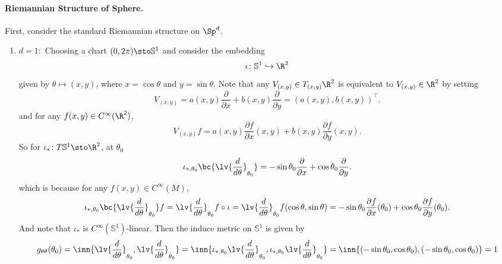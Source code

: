 \paragraph{Riemannian Structure of Sphere.} First, consider the standard Riemannian structure on $\Sp^d$.
\begin{enumerate}[label=\arabic{*}.]
    \item $d = 1:$ Choosing a chart $(0,2\pi) \sto \mathbb{S}^1$ and consider the embedding
    \begin{equation*}
        \iota \colon \mathbb{S}^1 \hookrightarrow \R^2
    \end{equation*}
    given by $\theta \mapsto (x,y)$, where $x = \cos \theta$ and $y = \sin \theta$. Note that any $V_{(x,y)} \in T_{(x,y)}\R^2$ is equivalent to $V_{(x,y)} \in \R^2$ by setting
    \begin{equation*}
        V_{(x,y)} = a(x,y) \frac{\partial}{\partial x} + b(x,y) \frac{\partial}{\partial y} = (a(x,y),b(x,y))^\top.
    \end{equation*}
    and for any $f(x,y) \in C^\infty(\R^2)$,
    \begin{equation*}
        V_{(x,y)}f = a(x,y)\frac{\partial f}{\partial x}(x,y) + b(x,y)\frac{\partial f}{\partial y}(x,y).
    \end{equation*}
    So for $\iota_* \colon T\mathbb{S}^1 \sto \R^2$, at $\theta_0$
    \begin{equation*}
        \iota_{*,\theta_0}\bc{\lv{\frac{d}{d \theta}}_{\theta_0}} = -\sin \theta_0 \frac{\partial}{\partial x} + \cos \theta_0 \frac{\partial}{\partial y}.
    \end{equation*}
    which is because for any $f(x,y) \in C^\infty(M)$,
    \begin{equation*}
        \iota_{*,\theta_0}\bc{\lv{\frac{d}{d \theta}}_{\theta_0}}f = \lv{\frac{d}{d \theta}}_{\theta_0} f \circ \iota = \lv{\frac{d}{d \theta}}_{\theta_0} f(\cos \theta,\sin \theta) = -\sin \theta_0 \frac{\partial f}{ \partial x}(\theta_0) + \cos \theta_0 \frac{\partial f}{ \partial y}(\theta_0).
    \end{equation*}
    And note that $\iota_*$ is $C^\infty(\mathbb{S}^1)$-linear. Then the induce metric on $\mathbb{S}^1$ is given by
    \begin{equation*}
        g_{\theta \theta}(\theta_0) = \inn{\lv{\frac{d}{d \theta}}_{\theta_0},\lv{\frac{d}{d \theta}}_{\theta_0}} = \inn{\iota_{*,\theta_0}\lv{\frac{d}{d \theta}}_{\theta_0},\iota_{*,\theta_0}\lv{\frac{d}{d \theta}}_{\theta_0}} = \inn{(-\sin \theta_0,\cos \theta_0),(-\sin \theta_0,\cos \theta_0)} = 1

\end{equation*}
\end{enumerate}
